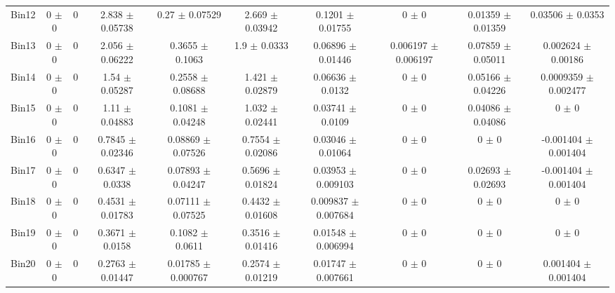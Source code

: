 \begin{tabular}{@{\extracolsep{4pt}}lccccccccc@{}}
     Bin12 & 0 $\pm$ 0 & 0 & 2.838 $\pm$ 0.05738 & 0.27 $\pm$ 0.07529 & 2.669 $\pm$ 0.03942 & 0.1201 $\pm$ 0.01755 & 0 $\pm$ 0 & 0.01359 $\pm$ 0.01359 & 0.03506 $\pm$ 0.0353 \\ 
     Bin13 & 0 $\pm$ 0 & 0 & 2.056 $\pm$ 0.06222 & 0.3655 $\pm$ 0.1063 & 1.9 $\pm$ 0.0333 & 0.06896 $\pm$ 0.01446 & 0.006197 $\pm$ 0.006197 & 0.07859 $\pm$ 0.05011 & 0.002624 $\pm$ 0.00186 \\ 
     Bin14 & 0 $\pm$ 0 & 0 & 1.54 $\pm$ 0.05287 & 0.2558 $\pm$ 0.08688 & 1.421 $\pm$ 0.02879 & 0.06636 $\pm$ 0.0132 & 0 $\pm$ 0 & 0.05166 $\pm$ 0.04226 & 0.0009359 $\pm$ 0.002477 \\ 
     Bin15 & 0 $\pm$ 0 & 0 & 1.11 $\pm$ 0.04883 & 0.1081 $\pm$ 0.04248 & 1.032 $\pm$ 0.02441 & 0.03741 $\pm$ 0.0109 & 0 $\pm$ 0 & 0.04086 $\pm$ 0.04086 & 0 $\pm$ 0 \\ 
     Bin16 & 0 $\pm$ 0 & 0 & 0.7845 $\pm$ 0.02346 & 0.08869 $\pm$ 0.07526 & 0.7554 $\pm$ 0.02086 & 0.03046 $\pm$ 0.01064 & 0 $\pm$ 0 & 0 $\pm$ 0 & -0.001404 $\pm$ 0.001404 \\ 
     Bin17 & 0 $\pm$ 0 & 0 & 0.6347 $\pm$ 0.0338 & 0.07893 $\pm$ 0.04247 & 0.5696 $\pm$ 0.01824 & 0.03953 $\pm$ 0.009103 & 0 $\pm$ 0 & 0.02693 $\pm$ 0.02693 & -0.001404 $\pm$ 0.001404 \\ 
     Bin18 & 0 $\pm$ 0 & 0 & 0.4531 $\pm$ 0.01783 & 0.07111 $\pm$ 0.07525 & 0.4432 $\pm$ 0.01608 & 0.009837 $\pm$ 0.007684 & 0 $\pm$ 0 & 0 $\pm$ 0 & 0 $\pm$ 0 \\ 
     Bin19 & 0 $\pm$ 0 & 0 & 0.3671 $\pm$ 0.0158 & 0.1082 $\pm$ 0.0611 & 0.3516 $\pm$ 0.01416 & 0.01548 $\pm$ 0.006994 & 0 $\pm$ 0 & 0 $\pm$ 0 & 0 $\pm$ 0 \\ 
     Bin20 & 0 $\pm$ 0 & 0 & 0.2763 $\pm$ 0.01447 & 0.01785 $\pm$ 0.000767 & 0.2574 $\pm$ 0.01219 & 0.01747 $\pm$ 0.007661 & 0 $\pm$ 0 & 0 $\pm$ 0 & 0.001404 $\pm$ 0.001404 \\ 
\hline\hline
  \end{tabular}

